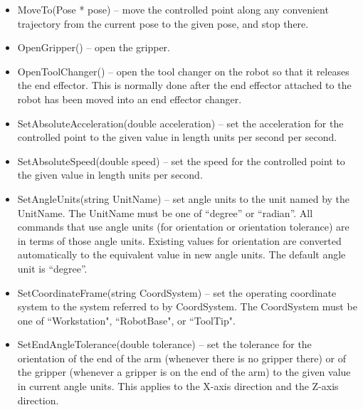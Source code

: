 \begin{itemize}
\item \sf MoveTo(Pose * pose) \rm -- move the controlled point along any
  convenient trajectory from the current pose to the given \sf pose\rm,
  and stop there.\\

\item \sf OpenGripper() \rm -- open the gripper.\\

\item \sf OpenToolChanger() \rm -- open the tool changer on the robot so
  that it releases the end effector.  This is normally done after the end
  effector attached to the robot has been moved into an end effector
  changer.\\

\item \sf SetAbsoluteAcceleration(double acceleration) \rm -- set the
  acceleration for the controlled point to the given value in length units
  per second per second.\\

\item \sf SetAbsoluteSpeed(double speed) \rm -- set the speed for the
  controlled point to the given value in length units per second.\\

\item \sf SetAngleUnits(string UnitName) \rm -- set angle units to the unit
  named by the \sf UnitName\rm.  The \sf UnitName \rm must be one of
  ``degree'' or ``radian''. All commands that use angle units (for
  orientation or orientation tolerance) are in terms of those angle
  units. Existing values for orientation are converted automatically to the
  equivalent value in new angle units.  The default angle unit is
  ``degree''.\\

\item \sf SetCoordinateFrame(string CoordSystem) \rm -- set the
operating coordinate system to the system referred to by
\sf CoordSystem\rm. The \sf CoordSystem \rm must be one of
``Workstation", ``RobotBase", or ``ToolTip".\\

\item \sf SetEndAngleTolerance(double tolerance) \rm -- set the tolerance
  for the orientation of the end of the arm (whenever there is no gripper
  there) or of the gripper (whenever a gripper is on the end of the arm) to
  the given value in current angle units. This applies to the X-axis direction
and the Z-axis direction.\\


\end{itemize}
